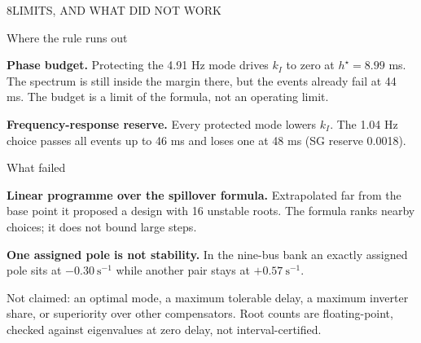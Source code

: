 \begin{minipage}[t][\PosterLowerRowHeight][t]{\PosterHalfWidth}\vspace{0pt}
  \begin{PosterPanel}{\PosterLowerRowHeight}{8}{LIMITS, AND WHAT DID NOT WORK}

    {\Subhead\color{IASDarkGreen}Where the rule runs out\par}\vspace{1mm}
    {\FigureSize \textbf{Phase budget.} Protecting the 4.91 Hz mode drives $k_I$ to zero at $h^{\star}=8.99$ ms. The spectrum is still inside the margin there, but the events already fail at 44 ms. The budget is a limit of the formula, not an operating limit.\par}
    \vspace{2mm}
    {\FigureSize \textbf{Frequency-response reserve.} Every protected mode lowers $k_I$. The 1.04 Hz choice passes all events up to 46 ms and loses one at 48 ms (SG reserve 0.0018).\par}
    \vspace{3mm}
    {\Subhead\color{IASDarkGreen}What failed\par}\vspace{1mm}
    {\FigureSize \textbf{Linear programme over the spillover formula.} Extrapolated far from the base point it proposed a design with 16 unstable roots. The formula ranks nearby choices; it does not bound large steps.\par}
    \vspace{2mm}
    {\FigureSize \textbf{One assigned pole is not stability.} In the nine-bus bank an exactly assigned pole sits at $-0.30\ \mathrm{s^{-1}}$ while another pair stays at $+0.57\ \mathrm{s^{-1}}$.\par}
    \vspace{3mm}
    \begin{InWords}\InWordsLabel Not claimed: an optimal mode, a maximum tolerable delay, a maximum inverter share, or superiority over other compensators. Root counts are floating-point, checked against eigenvalues at zero delay, not interval-certified.\end{InWords}

  \end{PosterPanel}
\end{minipage}%
